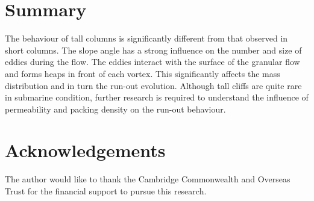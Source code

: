 \documentclass[epj,twocolumn]{webofc}
\begin{document}
\section{Summary}
The behaviour of tall columns is significantly different from that observed in 
short columns. The slope angle has a strong influence on the number 
and size of eddies during the flow. The eddies interact with the surface of the 
granular flow and forms heaps in front of each vortex. This significantly 
affects the mass distribution and in turn the run-out evolution. Although tall 
cliffs are quite rare in submarine condition, further research is
required to understand the influence of permeability and packing density
on the run-out behaviour.


\section*{Acknowledgements}
The author would like to thank the Cambridge Commonwealth and Overseas Trust
for the financial support to pursue this research.

 
\end{document}
